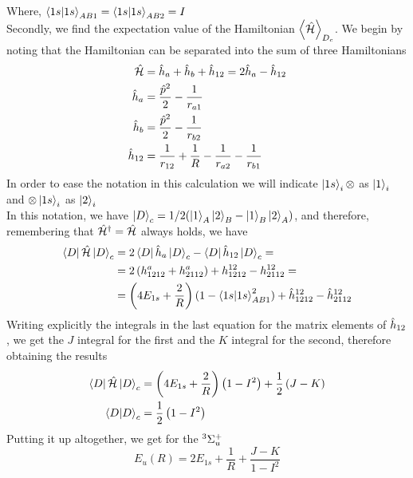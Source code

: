 \documentclass[../qm.tex]{subfiles}
\begin{document}
	Where, $\bra{1s}\ket{1s}_{AB1}=\bra{1s}\ket{1s}_{AB2}=I$\\
	Secondly, we find the expectation value of the Hamiltonian $\expval{\opr{\ham}}_{D_c}$. We begin by noting that the Hamiltonian can be separated into the sum of three Hamiltonians
	\begin{equation*}
		\begin{aligned}
			\opr{\ham}&=\opr{h}_a+\opr{h}_b+\opr{h}_{12}=2\opr{h}_a-\opr{h}_{12}\\
			\opr{h}_a&=\frac{\opr{p}^2}{2}-\frac{1}{r_{a1}}\\
			\opr{h}_b&=\frac{\opr{p}^2}{2}-\frac{1}{r_{b2}}\\
			\opr{h}_{12}&=\frac{1}{r_{12}}+\frac{1}{R}-\frac{1}{r_{a2}}-\frac{1}{r_{b1}}
		\end{aligned}
	\end{equation*}
	In order to ease the notation in this calculation we will indicate $\ket{1s}_i\otimes$ as $\ket{1}_i$ and $\otimes\ket{1s}_i$ as $\ket{2}_i$\\
	In this notation, we have $\ket{D}_c=1/2(\ket{1}_A\ket{2}_B-\ket{1}_B\ket{2}_A)$, and therefore, remembering that $\adj{\opr{\ham}}=\opr{\ham}$ always holds, we have
	\begin{equation*}
		\begin{aligned}
			\bra{D}\opr{\ham}\ket{D}_c&=2\bra{D}\opr{h}_a\ket{D}_c-\bra{D}\opr{h}_{12}\ket{D}_c=\\
			&=2\left(h^a_{1212}+h^a_{2112}\right)+h^{12}_{1212}-h^{12}_{2112}=\\
			&=\left(4E_{1s}+\frac{2}{R}\right)(1-\bra{1s}\ket{1s}_{AB1}^2)+\opr{h}^{12}_{1212}-\opr{h}^{12}_{2112}
		\end{aligned}
	\end{equation*}
	Writing explicitly the integrals in the last equation for the matrix elements of $\opr{h}_{12}$, we get the $J$ integral for the first and the $K$ integral for the second, therefore obtaining the results
	\begin{equation}
		\begin{aligned}
			\bra{D}\opr{\ham}\ket{D}_c&=\left( 4E_{1s}+\frac{2}{R} \right)\left( 1-I^2 \right)+\frac{1}{2}\left(J-K\right)\\
			\bra{D}\ket{D}_c&=\frac{1}{2}\left( 1-I^2 \right)\\
		\end{aligned}
		\label{eq:valencebondketd}
	\end{equation}
	Putting it up altogether, we get for the $\term[u]{\Sigma^+}{3}$
	\begin{equation}
		E_u(R)=2E_{1s}+\frac{1}{R}+\frac{J-K}{1-I^2}
		\label{eq:ungeradeenergyketd}
	\end{equation}
\end{document}

